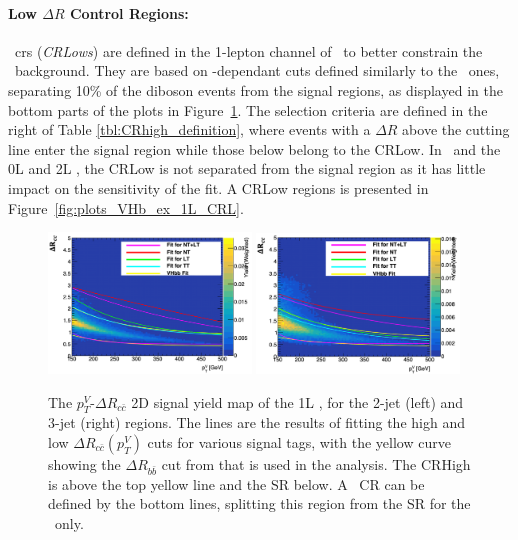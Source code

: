 \paragraph{Low $\Delta R$ Control Regions:} \lowdr\ \glspl{cr} (\textit{CRLows}) are defined in the 1-lepton channel of \vhb\ to better constrain the \whf\ background. They are based on \ptv-dependant cuts defined similarly to the \highdr\ ones, separating 10\% of the diboson events from the signal regions, as displayed in the bottom parts of the plots in Figure~\ref{fig:drccptvCutsVHcc}. The selection criteria are defined in the right of Table \ref{tbl:CRhigh_definition}, where events with a $\Delta R$ above the cutting line enter the signal region while those below belong to the CRLow. In \vhc\ and the 0L and 2L \vhb, the CRLow is not separated from the signal region as it has little impact on the sensitivity of the fit. A CRLow regions is presented in Figure~\ref{fig:plots_VHb_ex_1L_CRL}.

\begin{figure}[h!]
  \center
  \includegraphics[width=0.48\textwidth]{Images/VH/dRccpTV/sr1.png}
  \includegraphics[width=0.48\textwidth]{Images/VH/dRccpTV/sr2.png}
  \caption{The $p_T^V$-$\Delta R_{c\bar{c}}$ 2D signal yield map of the 1L \vhc, for the 2-jet (left) and 3-jet (right) regions. The lines are the results of fitting the high and low $\Delta R_{c\bar{c}}(p_T^V)$ cuts for various signal tags, with the yellow curve showing the $\Delta R_{b\bar{b}}$ cut from \vhb that is used in the analysis. The CRHigh is above the top yellow line and the SR below. A \lowdr\ CR can be defined by the bottom lines, splitting this region from the SR for the \vhb\ only.} 
  \label{fig:drccptvCutsVHcc}
\end{figure}

